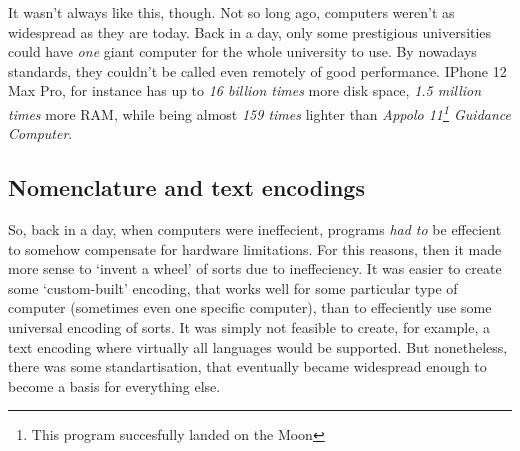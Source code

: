 \documentclass{report}
\begin{document}
            It wasn't always like this, though. Not so long ago, computers weren't as widespread as they are today. Back in a day, only some prestigious universities could have
            \emph{one} giant computer for the whole university to use. By nowadays standards, they couldn't be called even remotely of good performance. IPhone 12 Max Pro, for instance
            has up to \emph{16 billion times} more disk space, \emph{1.5 million times} more RAM, while being almost \emph{159 times} lighter than 
            \emph{Appolo 11\footnote{This program succesfully landed on the Moon} Guidance Computer}. \par

            \subsection{Nomenclature and text encodings}

            So, back in a day, when computers were ineffecient, programs \emph{had to} be effecient to somehow compensate for hardware limitations. For this reasons, then it 
            made more sense to `invent a wheel' of sorts due to ineffeciency. It was easier to create some `custom-built' encoding, that works well for some particular type
            of computer (sometimes even one specific computer), than to effeciently use some universal encoding of sorts. It was simply not feasible to create, for example,
            a text encoding where virtually all languages would be supported. But nonetheless, there was some standartisation, that eventually became widespread enough to 
            become a basis for everything else. \par
\end{document}
